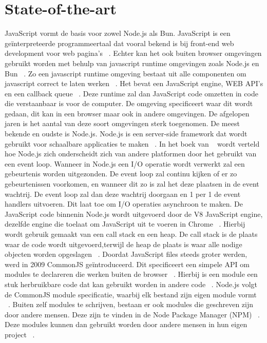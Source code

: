 \section{State-of-the-art}%
\label{sec:state-of-the-art}
JavaScript vormt de basis voor zowel Node.js als Bun. 
JavaScript is een geïnterpreteerde programmeertaal dat vooral bekend is bij front-end web development voor web pagina's ~\autocite{Mozilla2023}.
Echter kan het ook buiten browser omgevingen gebruikt worden met behulp van javascript runtime omgevingen zoals Node.js en Bun ~\autocite{Mozilla2023}.
Zo een javascript runtime omgeving bestaat uit alle componenten om javascript correct te laten werken ~\autocite{Christopher}. 
Het bevat een JavaScript engine, WEB API's en een callback queue ~\autocite{Christopher}. 
Deze runtime zal dan JavaScript code omzetten in code die verstaanbaar is voor de computer.
De omgeving specificeert waar dit wordt gedaan, dit kan in een browser maar ook in andere omgevingen.
De afgelopen jaren is het aantal van deze soort omgevingen sterk toegenomen. 
De meest bekende en oudste is Node.js. 
Node.js is een server-side framework dat wordt gebruikt voor schaalbare applicaties te maken ~\autocite{Gackenheimer2013}.
In het boek van ~\textcite{Ali2013} wordt verteld hoe Node.js zich onderscheidt zich van andere platformen door het gebruikt van een event loop. 
Wanneer in Node.js een I/O operatie wordt verwerkt zal een gebeurtenis worden uitgezonden. 
De event loop zal continu kijken of er zo gebeurtenissen voorkomen, 
en wanneer dit zo is zal het deze plaatsen in de event wachtrij. 
De event loop zal dan deze wachtrij doorgaan en 1 per 1 de event handlers uitvoeren. 
Dit laat toe om I/O operaties asynchroon te maken.
De JavaScript code binnenin Node.js wordt uitgevoerd door de V8 JavaScript engine, 
dezelfde engine die toelaat om JavaScript uit te voeren in Chrome ~\autocite{Syed2014}.
Hierbij wordt gebruik gemaakt van een call stack en een heap. 
De call stack is de plaats waar de code wordt uitgevoerd,terwijl de heap de plaats is waar alle nodige objecten worden opgeslagen ~\autocite{Christopher}.
Doordat JavaScript files steeds groter werden, werd in 2009 CommonJS geïntroduceerd. 
Dit specificeert een simpele API om modules te declareren die werken buiten de browser ~\autocite{Osmani2012}.
Hierbij is een module een stuk herbruikbare code dat kan gebruikt worden in  andere code ~\autocite{Osmani2012}.
Node.js volgt de CommonJS module specificatie, waarbij elk bestand zijn eigen module vormt ~\autocite{Syed2014}.
Buiten zelf modules te schrijven, bestaan er ook modules die geschreven zijn door andere mensen. 
Deze zijn te vinden in de Node Package Manager (NPM) ~\autocite{Wittern2016}. 
Deze modules kunnen dan gebruikt worden door andere mensen in hun eigen project ~\autocite{Ali2013}.

